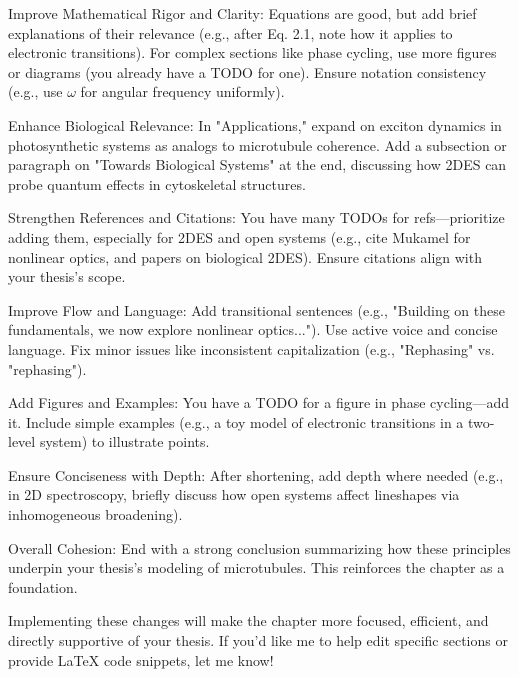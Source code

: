 {Improve Mathematical Rigor and Clarity: Equations are good, but add brief explanations of their relevance (e.g., after Eq. 2.1, note how it applies to electronic transitions). For complex sections like phase cycling, use more figures or diagrams (you already have a TODO for one). Ensure notation consistency (e.g., use $\omega$ for angular frequency uniformly).

Enhance Biological Relevance: In "Applications," expand on exciton dynamics in photosynthetic systems as analogs to microtubule coherence. Add a subsection or paragraph on "Towards Biological Systems" at the end, discussing how 2DES can probe quantum effects in cytoskeletal structures.

Strengthen References and Citations: You have many TODOs for refs—prioritize adding them, especially for 2DES and open systems (e.g., cite Mukamel for nonlinear optics, and papers on biological 2DES). Ensure citations align with your thesis's scope.

Improve Flow and Language: Add transitional sentences (e.g., "Building on these fundamentals, we now explore nonlinear optics..."). Use active voice and concise language. Fix minor issues like inconsistent capitalization (e.g., "Rephasing" vs. "rephasing").

Add Figures and Examples: You have a TODO for a figure in phase cycling—add it. Include simple examples (e.g., a toy model of electronic transitions in a two-level system) to illustrate points.

Ensure Conciseness with Depth: After shortening, add depth where needed (e.g., in 2D spectroscopy, briefly discuss how open systems affect lineshapes via inhomogeneous broadening).

Overall Cohesion: End with a strong conclusion summarizing how these principles underpin your thesis's modeling of microtubules. This reinforces the chapter as a foundation.

Implementing these changes will make the chapter more focused, efficient, and directly supportive of your thesis. If you'd like me to help edit specific sections or provide LaTeX code snippets, let me know!



}
